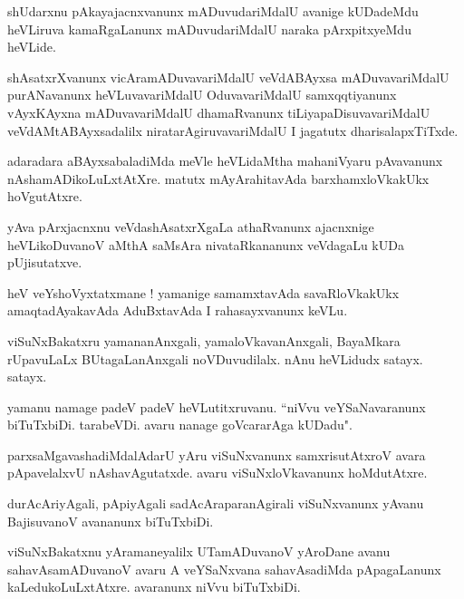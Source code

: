 \documentclass{article}
\begin{document}
\begin{mn}
shUdarxnu pAkayajacnxvanunx mADuvudariMdalU avanige kUDadeMdu heVLiruva kamaRgaLanunx 
mADuvudariMdalU naraka pArxpitxyeMdu heVLide.
\end{mn}

\begin{mn}
shAsatxrXvanunx vicAramADuvavariMdalU veVdABAyxsa mADuvavariMdalU purANavanunx heVLuvavariMdalU 
OduvavariMdalU samxqqtiyanunx vAyxKAyxna mADuvavariMdalU dhamaRvanunx tiLiyapaDisuvavariMdalU 
veVdAMtABAyxsadalilx niratarAgiruvavariMdalU I jagatutx dharisalapxTiTxde.
\end{mn}

\begin{mn}
adaradara aBAyxsabaladiMda meVle heVLidaMtha mahaniVyaru pAvavanunx nAshamADikoLuLxtAtXre. matutx 
mAyArahitavAda barxhamxloVkakUkx hoVgutAtxre.
\end{mn}

\begin{mn}
yAva pArxjacnxnu veVdashAsatxrXgaLa athaRvanunx ajacnxnige heVLikoDuvanoV aMthA saMsAra 
nivataRkananunx veVdagaLu kUDa pUjisutatxve.
\end{mn}

\begin{mn}
heV veYshoVyxtatxmane ! yamanige samamxtavAda savaRloVkakUkx amaqtadAyakavAda AduBxtavAda I 
rahasayxvanunx keVLu.
\end{mn}

\begin{mn}
viSuNxBakatxru yamananAnxgali, yamaloVkavanAnxgali, BayaMkara  rUpavuLaLx BUtagaLanAnxgali 
noVDuvudilalx. nAnu heVLidudx satayx. satayx.
\end{mn}

\begin{mn}
yamanu namage padeV padeV heVLutitxruvanu. ``niVvu veYSaNavaranunx biTuTxbiDi. tarabeVDi. avaru 
nanage goVcararAga kUDadu".
\end{mn}

\begin{mn}
parxsaMgavashadiMdalAdarU yAru viSuNxvanunx samxrisutAtxroV avara pApavelalxvU nAshavAgutatxde.
avaru viSuNxloVkavanunx hoMdutAtxre.
\end{mn}

\begin{mn}
durAcAriyAgali, pApiyAgali sadAcAraparanAgirali viSuNxvanunx yAvanu BajisuvanoV avananunx 
biTuTxbiDi.
\end{mn}

\begin{mn}
viSuNxBakatxnu yAramaneyalilx UTamADuvanoV yAroDane avanu sahavAsamADuvanoV avaru A veYSaNxvana 
sahavAsadiMda pApagaLanunx kaLedukoLuLxtAtxre. avaranunx niVvu biTuTxbiDi.
\end{mn}
\end{document}
